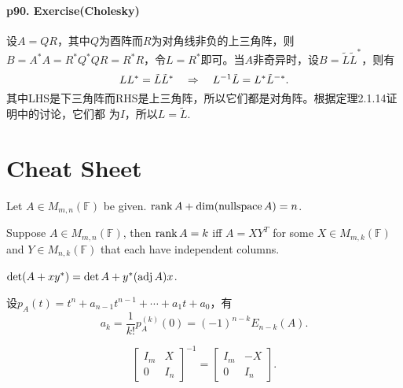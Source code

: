   \paragraph{p90. Exercise(Cholesky)}
    设$A=QR$，其中$Q$为酉阵而$R$为对角线非负的上三角阵，则$B=A^*A=R^*Q^*QR=R^*R$，令$L=
    R^*$即可。当$A$非奇异时，设$B=\tilde{L}\tilde{L}^*$，则有
    \[
      LL^*=\tilde{L}\tilde{L}^* \quad\Rightarrow\quad
      L^{-1}\tilde{L} = L^*\tilde{L}^{-*}.
    \]
    其中LHS是下三角阵而RHS是上三角阵，所以它们都是对角阵。根据定理2.1.14证明中的讨论，它们都
    为$I$，所以$L=\tilde{L}$.
  

\newpage
\section{Cheat Sheet}
  \begin{thm}
    Let $A\in M_{m,n}(\mathbb{F})$ be given. $\operatorname{rank} A + \dim(\operatorname{nullspace} A) = n$.
  \end{thm}

  \begin{lemma}
    Suppose $A\in M_{m,n}(\mathbb{F})$, then $\operatorname{rank} A = k$ iff $A=XY^T$ for some
    $X\in M_{m,k}(\mathbb{F})$ and $Y\in M_{n,k}(\mathbb{F})$ that each have 
    independent columns.
  \end{lemma}

  \begin{lemma}
    $\det(A+xy^*) = \det A + y^*(\operatorname{adj} A)x$.
  \end{lemma}

  \begin{lemma}[特征多项式系数]
    设$p_A(t)=t^n+a_{n-1}t^{n-1}+\cdots+a_1t+a_0$，有
    \[
      a_k = \frac{1}{k!}p_A^{(k)}(0) = (-1)^{n-k}E_{n-k}(A).
    \]
  \end{lemma}

  \begin{lemma}
    \[
      \begin{bmatrix}
        I_m & X \\
        0   & I_n
      \end{bmatrix}^{-1}
      = \begin{bmatrix}
        I_m & -X \\
        0   & I_n
      \end{bmatrix}.
    \]
  \end{lemma}


